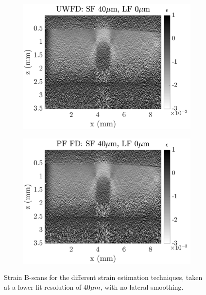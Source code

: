 \begin{figure}[h]
\begin{subfigure}{0.49\textwidth}
        \includegraphics[width=\textwidth]{appendix_figs/uwfd_fr40_lr0.png}
    \end{subfigure}
    \begin{subfigure}{0.49\textwidth}
    	\centering
        \includegraphics[width=\textwidth]{appendix_figs/pffd_fr40_lr0.png}
    \end{subfigure}    
    \caption{Strain B-scans for the different strain estimation techniques, taken at a lower fit resolution of $40\mu m$, with no lateral smoothing.}
	\label{fr40_lr0}
\end{figure}

